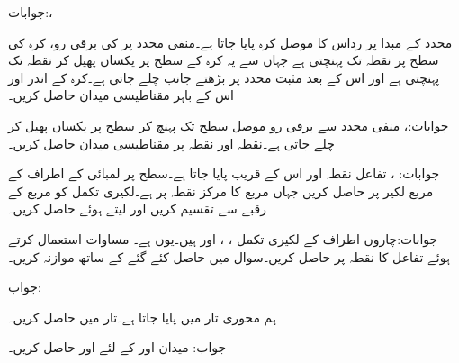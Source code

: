 جوابات:، 

محدد کے مبدا پر رداس  کا موصل کرہ پایا جاتا ہے۔منفی  محدد پر  کی برقی رو، کرہ کی سطح پر نقطہ  تک پہنچتی ہے جہاں سے یہ کرہ کے سطح پر یکساں پھیل کر نقطہ  تک پہنچتی ہے اور اس کے بعد مثبت  محدد پر بڑھتے جانب چلے جاتی ہے۔کرہ کے اندر اور اس کے باہر مقناطیسی میدان حاصل کریں۔

جوابات:،    
منفی  محدد سے برقی رو  موصل   سطح تک پہنچ کر سطح پر یکساں پھیل کر چلے جاتی ہے۔نقطہ  اور نقطہ  پر مقناطیسی میدان  حاصل کریں۔

جوابات: ، 
تفاعل  نقطہ  اور اس کے قریب پایا جاتا ہے۔سطح  پر  لمبائی کے اطراف کے مربع لکیر پر  حاصل کریں جہاں مربع کا مرکز نقطہ  پر ہے۔لکیری تکمل کو مربع کے رقبے سے تقسیم کریں اور  لیتے ہوئے  حاصل کریں۔

جوابات:چاروں اطراف کے لکیری تکمل ، ،   اور  ہیں۔یوں  ہے۔
مساوات  استعمال کرتے ہوئے تفاعل  کا نقطہ  پر  حاصل کریں۔سوال  میں حاصل کئے گئے  کے ساتھ موازنہ کریں۔

جواب: 

ہم محوری تار میں  پایا جاتا ہے۔تار میں  حاصل کریں۔

جواب:
میدان  اور  کے لئے  اور  حاصل کریں۔

